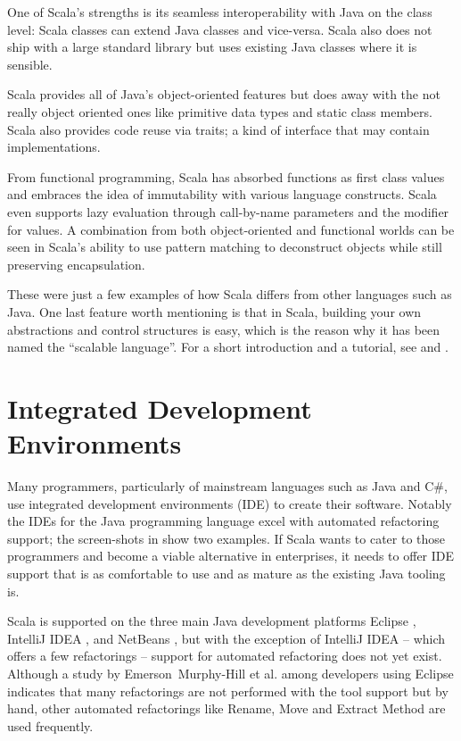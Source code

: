 \documentclass[10pt,a4paper,oneside]{scrreprt}
\begin{document}
One of Scala's strengths is its seamless interoperability with Java on the class level: Scala classes can extend Java classes and vice-versa. Scala also does not ship with a large standard library but uses existing Java classes where it is sensible.

Scala provides all of Java's object-oriented features but does away with the not really object oriented ones like primitive data types and static class members. Scala also provides code reuse via traits; a kind of interface that may contain implementations.

From functional programming, Scala has absorbed functions as first class values and embraces the idea of immutability with various language constructs. Scala even supports lazy evaluation through call-by-name parameters and the  modifier for values. A combination from both object-oriented and functional worlds can be seen in Scala's ability to use pattern matching to deconstruct objects while still preserving encapsulation.

These were just a few examples of how Scala differs from other languages such as Java. One last feature worth mentioning is that in Scala, building your own abstractions and control structures is easy, which is the reason why it has been named the ``scalable language''. For a short introduction and a tutorial, see \cite{ScalaTutorial} and \cite{ScalaByExample}.

\section{Integrated Development Environments}

Many programmers, particularly of mainstream languages such as Java and C\#, use integrated development environments (IDE) to create their software. Notably the IDEs for the Java programming language excel with automated refactoring support; the screen-shots in  show two examples. If Scala wants to cater to those programmers and become a viable alternative in enterprises, it needs to offer IDE support that is as comfortable to use and as mature as the existing Java tooling is.

Scala is supported on the three main Java development platforms Eclipse \cite{EclipseScalaIDE}, IntelliJ IDEA \cite{IntelliJScalaIDE}, and NetBeans \cite{NetBeansJScalaIDE}, but with the exception of IntelliJ IDEA -- which offers a few refactorings -- support for automated refactoring does not yet exist. Although a study by Emerson~Murphy-Hill et al. among developers using Eclipse \cite{RefactoringStudy} indicates that many refactorings are not performed with the tool support but by hand, other automated refactorings like Rename, Move and Extract Method are used frequently.
\end{document}
